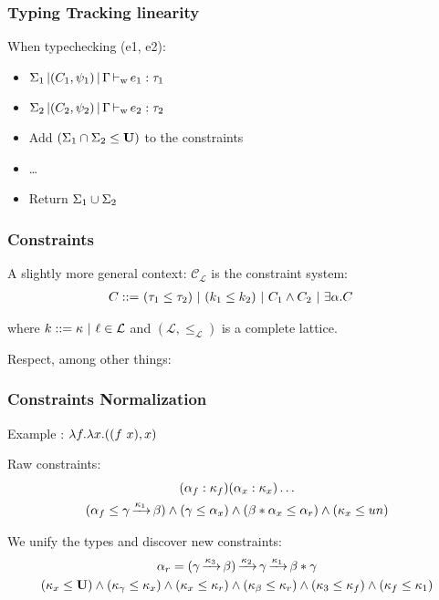 \documentclass[xcolor=svgnames,11pt]{beamer}
\begin{document}
\begin{frame}
  \frametitle{Typing \hfill Tracking linearity}
  
  When typechecking (e1, e2):
  \begin{itemize}[<+->]
  \item $\Sigma_1 \operatorname{|} (C_1,\psi_1) \operatorname{|} \Gamma \operatorname{\vdash_w} e_1 : \tau_1$
  \item $\Sigma_2 \operatorname{|} (C_2,\psi_2) \operatorname{|} \Gamma \operatorname{\vdash_w} e_2 : \tau_2$
  \item Add  $(\Sigma_1\cap\Sigma_2\leq \mathbf{U})$ to the constraints
  \item \dots
  \item Return $\Sigma_1\cup\Sigma_2$
  \end{itemize}

\end{frame}


\newcommand\lub\bigvee
\newcommand\glb\bigwedge
\newcommand\CL{{\mathcal C_{\mathcal L}}}

\begin{frame}
  \frametitle{Constraints}

  A slightly more general context: $\CL$ is the constraint system:
  \begin{align*}
    C ::=&\ (\tau_1 \leq \tau_2)\ |\ (k_1 \leq k_2)\ |\ C_1 \wedge C_2\ |\ \exists \alpha.C
  \end{align*}

  where $k ::=\kappa\ |\ \ell \in {\mathcal L}$ and
  $(\mathcal L, \leq_{\mathcal L})$ is a complete lattice.
  \pause

  Respect, among other things:
  
\end{frame}

\begin{frame}
  \frametitle{Constraints \hfill Normalization}

  Example : $\lambda f . \lambda x . ((f\ x),x)$

  Raw constraints:
  \begin{gather*}
    (\alpha_f : \kappa_f)
    (\alpha_x : \kappa_x)\dots\\
    (\alpha_f \leq \gamma \operatorname{\xrightarrow{\kappa_1}} \beta )
    \wedge
    (\gamma \leq \alpha_x)
    \wedge
    (\beta * \alpha_x \leq \alpha_r)
    \wedge
    (\kappa_x \leq un)
  \end{gather*}\pause

  We unify the types and discover new constraints:
  \begin{gather*}
    \alpha_r =
    (\gamma \operatorname{\xrightarrow{\kappa_3}} \beta) \operatorname{\xrightarrow{\kappa_2}} \gamma \operatorname{\xrightarrow{\kappa_1}} \beta * \gamma\\
    (\kappa_x \leq \mathbf{U})
    \wedge
    (\kappa_\gamma \leq \kappa_x)
    \wedge
    (\kappa_x \leq \kappa_r)
    \wedge
    (\kappa_\beta \leq \kappa_r)
    \wedge
    (\kappa_3 \leq \kappa_f)
    \wedge
    (\kappa_f \leq \kappa_1)
  \end{gather*}
\end{frame}
\end{document}
